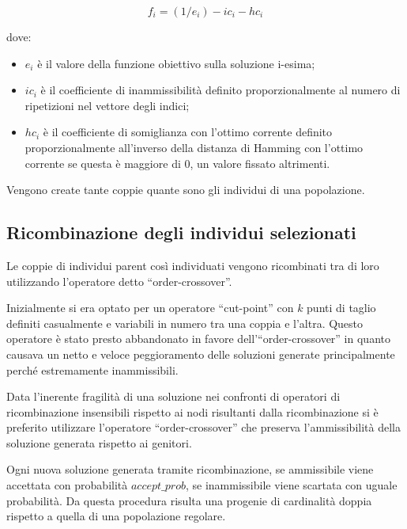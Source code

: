 \documentclass[a4paper]{article}
\begin{document}
            $$f_i = (1 / e_i) - ic_i - hc_i$$

            dove:
            \begin{itemize}
                \item $e_i$ \`e il valore della funzione obiettivo sulla soluzione i-esima;
                \item $ic_i$ \`e il coefficiente di inammissibilit\`a definito proporzionalmente
                    al numero di ripetizioni nel vettore degli indici;
                \item $hc_i$ \`e il coefficiente di somiglianza con l'ottimo corrente definito proporzionalmente
                    all'inverso della distanza di Hamming con l'ottimo corrente se questa \`e maggiore di 0, un valore
                    fissato altrimenti.
            \end{itemize}

            Vengono create tante coppie quante sono gli individui di una popolazione.
        
        \subsection{Ricombinazione degli individui selezionati}
            Le coppie di individui parent cos\`i individuati vengono ricombinati tra di loro utilizzando l'operatore detto
            ``order-crossover''.

            Inizialmente si era optato per un operatore ``cut-point'' con $k$ punti di taglio definiti casualmente e variabili
            in numero tra una coppia e l'altra.
            Questo operatore \`e stato presto abbandonato in favore dell'``order-crossover'' in quanto causava un netto e veloce
            peggioramento delle soluzioni generate principalmente perch\'e estremamente inammissibili.

            Data l'inerente fragilit\`a di una soluzione nei confronti di operatori di ricombinazione insensibili rispetto ai nodi
            risultanti dalla ricombinazione si \`e preferito utilizzare l'operatore ``order-crossover'' che preserva l'ammissibilit\`a
            della soluzione generata rispetto ai genitori.

            Ogni nuova soluzione generata tramite ricombinazione, se ammissibile viene accettata con probabilit\`a $accept\_prob$,
            se inammissibile viene scartata con uguale probabilit\`a.
            Da questa procedura risulta una progenie di cardinalit\`a doppia rispetto a quella di una popolazione regolare.
\end{document}
